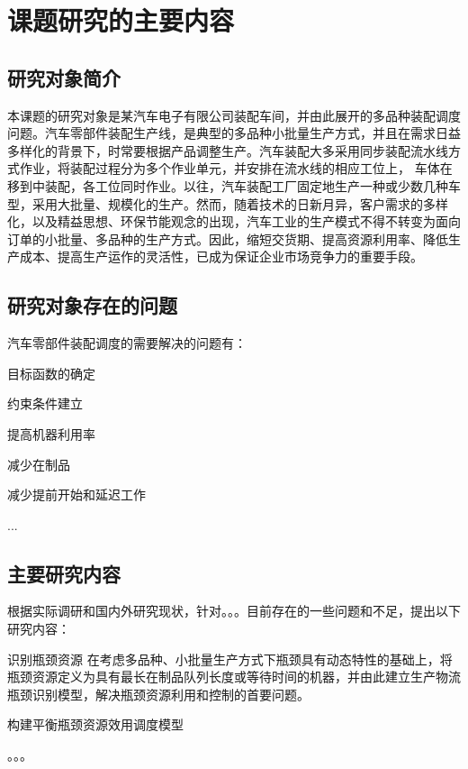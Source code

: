 \chapter{课题研究的主要内容}
\section{研究对象简介}
本课题的研究对象是某汽车电子有限公司装配车间，并由此展开的多品种装配调度问题。汽车零部件装配生产线，是典型的多品种小批量生产方式，并且在需求日益多样化的背景下，时常要根据产品调整生产。汽车装配大多采用同步装配流水线方式作业，将装配过程分为多个作业单元，并安排在流水线的相应工位上，
车体在移到中装配，各工位同时作业。以往，汽车装配工厂固定地生产一种或少数几种车型，采用大批量、规模化的生产。然而，随着技术的日新月异，客户需求的多样化，以及精益思想、环保节能观念的出现，汽车工业的生产模式不得不转变为面向订单的小批量、多品种的生产方式。因此，缩短交货期、提高资源利用率、降低生产成本、提高生产运作的灵活性，已成为保证企业市场竞争力的重要手段。

\section{研究对象存在的问题}
汽车零部件装配调度的需要解决的问题有：
\begin{asparaenum}[(1)]
\item 目标函数的确定
\item 约束条件建立
\item 提高机器利用率
\item 减少在制品
\item 减少提前开始和延迟工作
\item ...
\end{asparaenum}

\section{主要研究内容}
根据实际调研和国内外研究现状，针对。。。目前存在的一些问题和不足，提出以下研究内容：
\renewcommand{\labelenumi}{(\theenumi)}
\begin{asparaenum}
\item 识别瓶颈资源
在考虑多品种、小批量生产方式下瓶颈具有动态特性的基础上，将瓶颈资源定义为具有最长在制品队列长度或等待时间的机器，并由此建立生产物流瓶颈识别模型，解决瓶颈资源利用和控制的首要问题。
\item 构建平衡瓶颈资源效用调度模型
\end{asparaenum}
。。。

